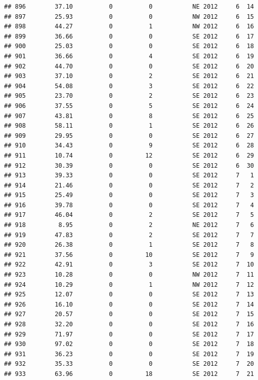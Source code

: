 \documentclass[
]{article}
\begin{document}
\begin{verbatim}
## 896        37.10          0          0           NE 2012     6  14
## 897        25.93          0          0           NW 2012     6  15
## 898        44.27          0          1           NW 2012     6  16
## 899        36.66          0          0           SE 2012     6  17
## 900        25.03          0          0           SE 2012     6  18
## 901        36.66          0          4           SE 2012     6  19
## 902        44.70          0          0           SE 2012     6  20
## 903        37.10          0          2           SE 2012     6  21
## 904        54.08          0          3           SE 2012     6  22
## 905        23.70          0          2           SE 2012     6  23
## 906        37.55          0          5           SE 2012     6  24
## 907        43.81          0          8           SE 2012     6  25
## 908        58.11          0          1           SE 2012     6  26
## 909        29.95          0          0           SE 2012     6  27
## 910        34.43          0          9           SE 2012     6  28
## 911        10.74          0         12           SE 2012     6  29
## 912        30.39          0          0           SE 2012     6  30
## 913        39.33          0          0           SE 2012     7   1
## 914        21.46          0          0           SE 2012     7   2
## 915        25.49          0          0           SE 2012     7   3
## 916        39.78          0          0           SE 2012     7   4
## 917        46.04          0          2           SE 2012     7   5
## 918         8.95          0          2           NE 2012     7   6
## 919        47.83          0          2           SE 2012     7   7
## 920        26.38          0          1           SE 2012     7   8
## 921        37.56          0         10           SE 2012     7   9
## 922        42.91          0          3           SE 2012     7  10
## 923        10.28          0          0           NW 2012     7  11
## 924        10.29          0          1           NW 2012     7  12
## 925        12.07          0          0           SE 2012     7  13
## 926        16.10          0          0           SE 2012     7  14
## 927        20.57          0          0           SE 2012     7  15
## 928        32.20          0          0           SE 2012     7  16
## 929        71.97          0          0           SE 2012     7  17
## 930        97.02          0          0           SE 2012     7  18
## 931        36.23          0          0           SE 2012     7  19
## 932        35.33          0          0           SE 2012     7  20
## 933        63.96          0         18           SE 2012     7  21

\end{verbatim}
\end{document}
